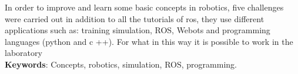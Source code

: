 \begin{thesisabastract}
In order to improve and learn some basic concepts in robotics, five challenges were carried out in addition to all the tutorials
of ros, they use different applications such as: training simulation, ROS, Webots and programming languages ​​(python and c ++). For what
in this way it is possible to work in the laboratory
\ \\


\textbf{Keywords}: Concepts, robotics, simulation, ROS, programming.

\end{thesisabastract}

